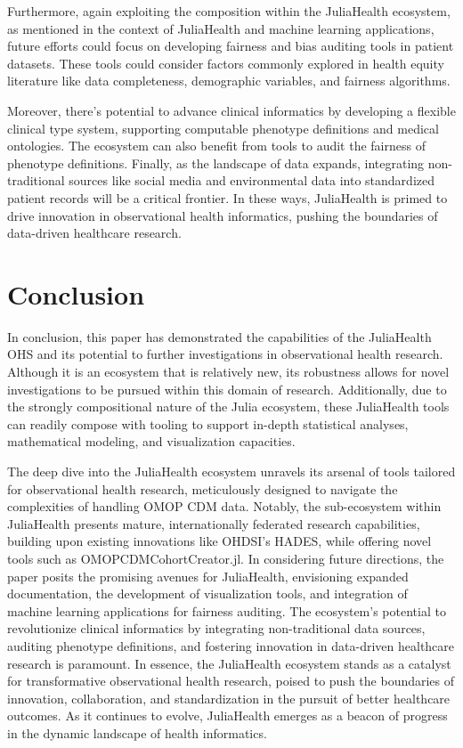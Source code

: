 \documentclass{juliacon}
\begin{document}
Furthermore, again exploiting the composition within the JuliaHealth ecosystem, as mentioned in the context of JuliaHealth and machine learning applications, future efforts could focus on developing fairness and bias auditing tools in patient datasets.
These tools could consider factors commonly explored in health equity literature like data completeness, demographic variables, and fairness algorithms. 

Moreover, there's potential to advance clinical informatics by developing a flexible clinical type system, supporting computable phenotype definitions and medical ontologies. The ecosystem can also benefit from tools to audit the fairness of phenotype definitions. Finally, as the landscape of data expands, integrating non-traditional sources like social media and environmental data into standardized patient records will be a critical frontier. In these ways, JuliaHealth is primed to drive innovation in observational health informatics, pushing the boundaries of data-driven healthcare research.

\section{Conclusion}

In conclusion, this paper has demonstrated the capabilities of the JuliaHealth OHS and its potential to further investigations in observational health research.
Although it is an ecosystem that is relatively new, its robustness allows for novel investigations to be pursued within this domain of research. 
Additionally, due to the strongly compositional nature of the Julia ecosystem, these JuliaHealth tools can readily compose with tooling to support in-depth statistical analyses, mathematical modeling, and visualization capacities.

The deep dive into the JuliaHealth ecosystem unravels its arsenal of tools tailored for observational health research, meticulously designed to navigate the complexities of handling OMOP CDM data. Notably, the sub-ecosystem within JuliaHealth presents mature, internationally federated research capabilities, building upon existing innovations like OHDSI's HADES, while offering novel tools such as OMOPCDMCohortCreator.jl.
In considering future directions, the paper posits the promising avenues for JuliaHealth, envisioning expanded documentation, the development of visualization tools, and integration of machine learning applications for fairness auditing. The ecosystem's potential to revolutionize clinical informatics by integrating non-traditional data sources, auditing phenotype definitions, and fostering innovation in data-driven healthcare research is paramount.
In essence, the JuliaHealth ecosystem stands as a catalyst for transformative observational health research, poised to push the boundaries of innovation, collaboration, and standardization in the pursuit of better healthcare outcomes. As it continues to evolve, JuliaHealth emerges as a beacon of progress in the dynamic landscape of health informatics.
\end{document}
